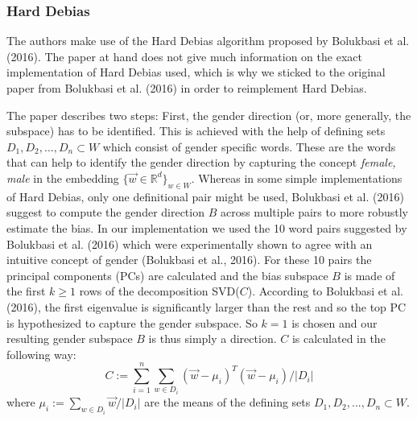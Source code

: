 \documentclass[
  english,
  man,floatsintext]{apa6}
\begin{document}
\hypertarget{hard-debias}{%
\subsubsection{Hard Debias}\label{hard-debias}}

The authors make use of the Hard Debias algorithm proposed by Bolukbasi et al. (2016). The paper at hand does not give much information on the exact implementation of Hard Debias used, which is why we sticked to the original paper from Bolukbasi et al. (2016) in order to reimplement Hard Debias.

The paper describes two steps: First, the gender direction (or, more generally, the subspace) has to be identified. This is achieved with the help of defining sets \(D_1, D_2, ..., D_n \subset W\) which consist of gender specific words. These are the words that can help to identify the gender direction by capturing the concept \emph{female, male} in the embedding \(\{\vec{w}\in\mathbb{R}^d\}_{w\in W}\). Whereas in some simple implementations of Hard Debias, only one definitional pair might be used, Bolukbasi et al. (2016) suggest to compute the gender direction \(B\) across multiple pairs to more robustly estimate the bias. In our implementation we used the 10 word pairs suggested by Bolukbasi et al. (2016) which were experimentally shown to agree with an intuitive concept of gender (Bolukbasi et al., 2016). For these 10 pairs the principal components (PCs) are calculated and the bias subspace \(B\) is made of the first \(k \geq 1\) rows of the decomposition SVD(\(C\)). According to Bolukbasi et al. (2016), the first eigenvalue is significantly larger than the rest and so the top PC is hypothesized to capture the gender subspace. So \(k=1\) is chosen and our resulting gender subspace \(B\) is thus simply a direction. \(C\) is calculated in the following way: \[C:=\sum_{i=1}^n \sum_{w\in D_i}(\vec{w}-\mu_i)^T(\vec{w}-\mu_i)/|D_i|\] where \(\mu_i := \sum_{w\in D_i}\vec{w}/|D_i|\) are the means of the defining sets \(D_1, D_2, ..., D_n \subset W\).
\end{document}

